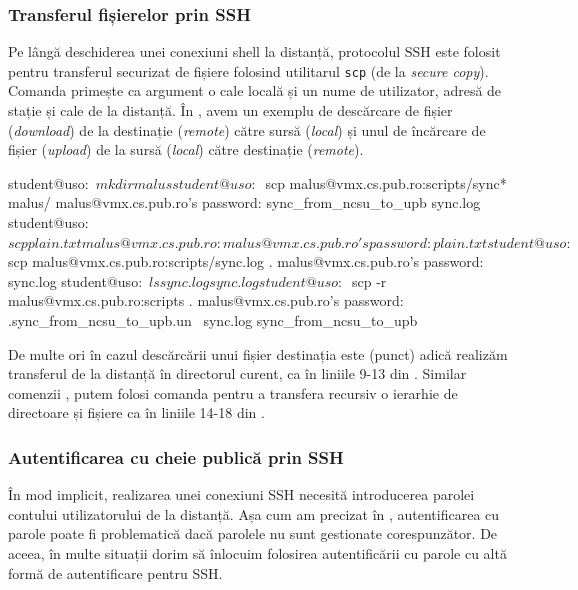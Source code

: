 \subsubsection{Transferul fișierelor prin SSH}
\label{sec:sec:transfer:ssh:transfer}

Pe lângă deschiderea unei conexiuni shell la distanță, protocolul SSH este folosit pentru transferul securizat de fișiere folosind utilitarul \texttt{scp} (de la \textit{secure copy}).
Comanda  primește ca argument o cale locală și un nume de utilizator, adresă de stație și cale de la distanță.
În , avem un exemplu de descărcare de fișier (\textit{download}) de la destinație (\textit{remote}) către sursă (\textit{local}) și unul de încărcare de fișier (\textit{upload}) de la sursă (\textit{local}) către destinație (\textit{remote}).

\begin{screen}[caption={Transfer de fișiere prin SSH (scp)},label={lst:sec:scp}]
student@uso:~$ mkdir malus
student@uso:~$ scp malus@vmx.cs.pub.ro:scripts/sync* malus/
malus@vmx.cs.pub.ro's password:
sync_from_ncsu_to_upb
sync.log
student@uso:~$ scp plain.txt malus@vmx.cs.pub.ro:
malus@vmx.cs.pub.ro's password:
plain.txt
student@uso:~$ scp malus@vmx.cs.pub.ro:scripts/sync.log .
malus@vmx.cs.pub.ro's password:
sync.log
student@uso:~$ ls sync.log
sync.log
student@uso:~$ scp -r malus@vmx.cs.pub.ro:scripts .
malus@vmx.cs.pub.ro's password:
.sync_from_ncsu_to_upb.un~
sync.log
sync_from_ncsu_to_upb
\end{screen}

De multe ori în cazul descărcării unui fișier destinația este  (punct) adică realizăm transferul de la distanță în directorul curent, ca în liniile 9-13 din .
Similar comenzii , putem folosi comanda  pentru a transfera recursiv o ierarhie de directoare și fișiere ca în liniile 14-18 din .

\subsubsection{Autentificarea cu cheie publică prin SSH}
\label{sec:sec:transfer:ssh:pub-auth}

În mod implicit, realizarea unei conexiuni SSH necesită introducerea parolei contului utilizatorului de la distanță.
Așa cum am precizat în , autentificarea cu parole poate fi problematică dacă parolele nu sunt gestionate corespunzător.
De aceea, în multe situații dorim să înlocuim folosirea autentificării cu parole cu altă formă de autentificare pentru SSH.

